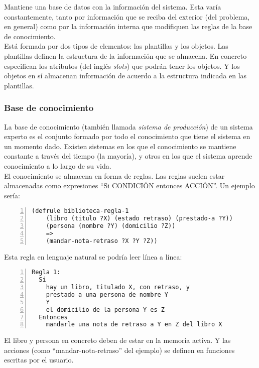 Mantiene una base de datos con la información del sistema. Esta
varía constantemente, tanto por información que se reciba
del exterior (del problema, en general) como por la información
interna que modifiquen las reglas de la base de conocimiento. \\

Está formada por dos tipos de elementos: las plantillas y los
objetos. Las plantillas definen la estructura de la información que se
almacena. En concreto especifican los atributos (del inglés
\emph{slots}) que podrán tener los objetos. Y los objetos en sí
almacenan información de acuerdo a la estructura indicada en las
plantillas.


\subsubsection{Base de conocimiento}

La base de conocimiento (también llamada \emph{sistema de producción}) de un
sistema experto es el conjunto formado por todo el conocimiento que
tiene el sistema en un momento dado. Existen sistemas en los que el
conocimiento se mantiene constante a través del tiempo (la mayoría), y
otros en los que el sistema aprende conocimiento a lo largo de su
vida. \\

El conocimiento se almacena en forma de reglas. Las reglas suelen
estar almacenadas como expresiones ``Si CONDICIÓN entonces
ACCIÓN''. Un ejemplo sería:

\begin{lstlisting}[caption={Regla en pseudocódigo}, numbers=left]
  (defrule biblioteca-regla-1
    (libro (titulo ?X) (estado retraso) (prestado-a ?Y))
    (persona (nombre ?Y) (domicilio ?Z))
    =>
    (mandar-nota-retraso ?X ?Y ?Z))
\end{lstlisting}

Esta regla en lenguaje natural se podría leer línea a línea:
\begin{lstlisting}[caption={Regla en lenguaje natural}, numbers=left]
Regla 1:
  Si
    hay un libro, titulado X, con retraso, y 
    prestado a una persona de nombre Y
    Y
    el domicilio de la persona Y es Z
  Entonces
    mandarle una nota de retraso a Y en Z del libro X
\end{lstlisting}

El libro y persona en concreto deben de estar en la memoria activa. Y
las acciones (como ``mandar-nota-retraso'' del ejemplo) se definen en
funciones escritas por el usuario. \\

